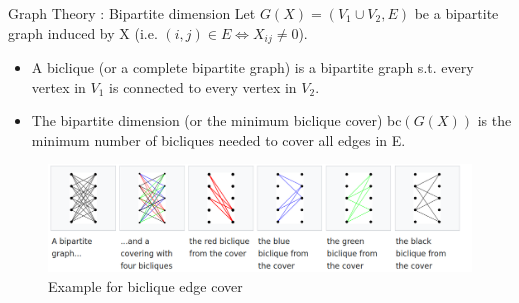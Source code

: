 \begin{frame}{Graph Theory : Bipartite dimension}
Let $G(X) = (V_1 \cup V_2, E)$ be a bipartite graph induced by X (i.e. $(i,j)\in E \Leftrightarrow X_{ij}\neq 0$).
\begin{defn}
\begin{itemize}
\item A biclique (or a complete bipartite graph) is a bipartite graph s.t. every vertex in $V_1$ is connected to every vertex in $V_2$. 
\item The bipartite dimension (or the minimum biclique cover) bc$(G(X))$ is the minimum number of bicliques needed to cover all edges in E.
\end{itemize} 
\end{defn}
\begin{figure}
\centering
\includegraphics[scale=0.18]{Section4/biclique.png}
\caption{Example for biclique edge cover \cite{biclique}}
\end{figure}

\end{frame}